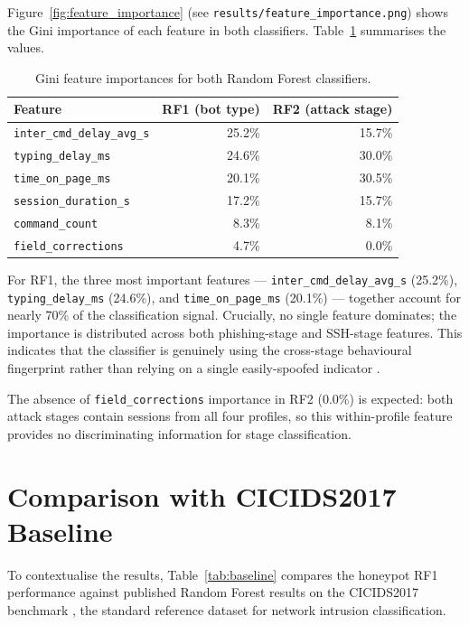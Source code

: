 Figure~\ref{fig:feature_importance} (see \texttt{results/feature\_importance.png})
shows the Gini importance of each feature in both classifiers.
Table~\ref{tab:feature_importance} summarises the values.

\begin{table}[h]
\centering
\caption{Gini feature importances for both Random Forest classifiers.}
\label{tab:feature_importance}
\begin{tabular}{lrr}
\hline
\textbf{Feature} & \textbf{RF1 (bot type)} & \textbf{RF2 (attack stage)} \\
\hline
\texttt{inter\_cmd\_delay\_avg\_s} & 25.2\% & 15.7\% \\
\texttt{typing\_delay\_ms}         & 24.6\% & 30.0\% \\
\texttt{time\_on\_page\_ms}        & 20.1\% & 30.5\% \\
\texttt{session\_duration\_s}      & 17.2\% & 15.7\% \\
\texttt{command\_count}            & 8.3\%  & 8.1\%  \\
\texttt{field\_corrections}        & 4.7\%  & 0.0\%  \\
\hline
\end{tabular}
\end{table}

For RF1, the three most important features — \texttt{inter\_cmd\_delay\_avg\_s}
(25.2\%), \texttt{typing\_delay\_ms} (24.6\%), and
\texttt{time\_on\_page\_ms} (20.1\%) — together account for nearly 70\%
of the classification signal. Crucially, no single feature dominates;
the importance is distributed across both phishing-stage and SSH-stage
features. This indicates that the classifier is genuinely using the
cross-stage behavioural fingerprint rather than relying on a single
easily-spoofed indicator \cite{Holz2006AttackPatterns}.

The absence of \texttt{field\_corrections} importance in RF2 (0.0\%)
is expected: both attack stages contain sessions from all four profiles,
so this within-profile feature provides no discriminating information
for stage classification.

\section{Comparison with CICIDS2017 Baseline}

To contextualise the results, Table~\ref{tab:baseline} compares the
honeypot RF1 performance against published Random Forest results on the
CICIDS2017 benchmark \cite{Bringer2012HoneypotSurvey}, the standard
reference dataset for network intrusion classification.

